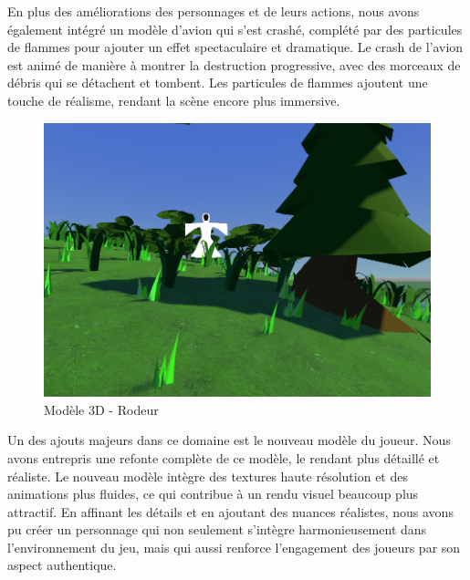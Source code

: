 \documentclass[
	article,			%
	11pt,				%
	oneside,			%
	a4paper,			%
	chapter=TITLE,
	french,			%
	sumario=tradicional
	]{base_nt}
\begin{document}
En plus des améliorations des personnages et de leurs actions, nous avons également intégré un modèle d'avion qui s'est crashé, complété par des particules de flammes pour ajouter un effet spectaculaire et dramatique. Le crash de l'avion est animé de manière à montrer la destruction progressive, avec des morceaux de débris qui se détachent et tombent. Les particules de flammes ajoutent une touche de réalisme, rendant la scène encore plus immersive.

\newpage

\begin{figure}[ht]
	\caption{Modèle 3D - Rodeur}
	\centering
	\includegraphics[width=1\linewidth]{paper19.png}
	\legend{}
	
\end{figure}

Un des ajouts majeurs dans ce domaine est le nouveau modèle du joueur. Nous avons entrepris une refonte complète de ce modèle, le rendant plus détaillé et réaliste. Le nouveau modèle intègre des textures haute résolution et des animations plus fluides, ce qui contribue à un rendu visuel beaucoup plus attractif. En affinant les détails et en ajoutant des nuances réalistes, nous avons pu créer un personnage qui non seulement s'intègre harmonieusement dans l'environnement du jeu, mais qui aussi renforce l'engagement des joueurs par son aspect authentique.

\newpage
\end{document}

